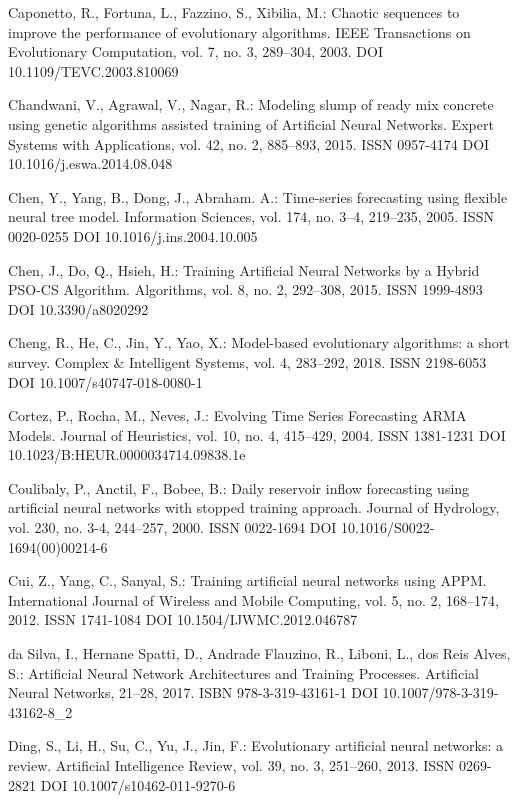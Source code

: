 \begin{thebibliography}{99.}
 Caponetto, R., Fortuna, L., Fazzino, S., Xibilia, M.: Chaotic sequences to improve the performance of evolutionary algorithms. IEEE Transactions on Evolutionary Computation, vol. 7, no. 3, 289--304, 2003. DOI 10.1109/TEVC.2003.810069

 Chandwani, V., Agrawal, V., Nagar, R.: Modeling slump of ready mix concrete using genetic algorithms assisted training of Artificial Neural Networks. Expert Systems with Applications, vol. 42, no. 2, 885--893, 2015. ISSN 0957-4174 DOI 10.1016/j.eswa.2014.08.048

 Chen, Y., Yang, B., Dong, J., Abraham. A.: Time-series forecasting using flexible neural tree model. Information Sciences, vol. 174, no. 3--4, 219--235, 2005. ISSN 0020-0255 DOI 10.1016/j.ins.2004.10.005

 Chen, J., Do, Q., Hsieh, H.: Training Artificial Neural Networks by a Hybrid PSO-CS Algorithm. Algorithms, vol. 8, no. 2, 292--308, 2015. ISSN 1999-4893 DOI 10.3390/a8020292

 Cheng, R., He, C., Jin, Y., Yao, X.: Model-based evolutionary algorithms: a short survey. Complex \& Intelligent Systems, vol. 4, 283--292, 2018. ISSN 2198-6053 DOI 10.1007/s40747-018-0080-1

 Cortez, P., Rocha, M., Neves, J.: Evolving Time Series Forecasting ARMA Models. Journal of Heuristics, vol. 10, no. 4, 415--429, 2004. ISSN 1381-1231 DOI 10.1023/B:HEUR.0000034714.09838.1e

 Coulibaly, P., Anctil, F., Bobee, B.: Daily reservoir inflow forecasting using artificial neural networks with stopped training approach. Journal of Hydrology, vol. 230, no. 3-4, 244--257, 2000. ISSN 0022-1694 DOI 10.1016/S0022-1694(00)00214-6

 Cui, Z., Yang, C., Sanyal, S.: Training artificial neural networks using APPM. International Journal of Wireless and Mobile Computing, vol. 5, no. 2, 168--174, 2012. ISSN 1741-1084 DOI 10.1504/IJWMC.2012.046787

 da Silva, I., Hernane Spatti, D., Andrade Flauzino, R., Liboni, L., dos Reis Alves, S.: Artificial Neural Network Architectures and Training Processes. Artificial Neural Networks, 21--28, 2017. ISBN 978-3-319-43161-1 DOI 10.1007/978-3-319-43162-8\_2

 Ding, S., Li, H., Su, C., Yu, J., Jin, F.: Evolutionary artificial neural networks: a review. Artificial Intelligence Review, vol. 39, no. 3, 251--260, 2013. ISSN 0269-2821 DOI 10.1007/s10462-011-9270-6


\end{thebibliography}

